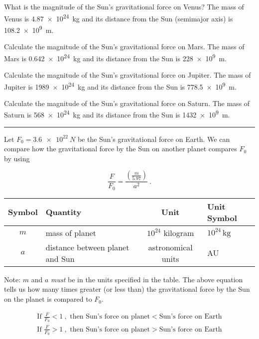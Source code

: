 \documentclass{article}
\begin{document}
\begin{problem}
What is the magnitude of the Sun's gravitational force on Venus? The mass of Venus is \SI{4.87e24}{kg} and its distance from the Sun (semimajor axis) is \SI{108.2e9}{m}. 
\end{problem}

\begin{problem}
    Calculate the magnitude of the Sun's gravitational force on Mars. The mass of Mars is \SI{0.642e24}{kg} and its distance from the Sun is \SI{228e9}{m}.
\end{problem}

\begin{problem}
    Calculate the magnitude of the Sun's gravitational force on Jupiter. The mass of Jupiter is \SI{1989e24}{kg} and its distance from the Sun is \SI{778.5e9}{m}.
\end{problem}

\begin{problem}
    Calculate the magnitude of the Sun's gravitational force on Saturn. The mass of Saturn is \SI{568e24}{kg} and its distance from the Sun is \SI{1432e9}{m}.
\end{problem}
\hrule

\clearpage
\begin{mdframed}[backgroundcolor=black!10]
Let $F_0 = \SI{3.6e22}{N}$ be the Sun's gravitational force on Earth. We can compare how the gravitational force by the Sun on another planet compares $F_0$ by using

\begin{equation*}
    \frac{F}{F_0} = \frac{\left(\frac{m}{5.97}\right)}{a^2}\ .
\end{equation*}

\begin{center}
    \begin{tabular}{cl|cl}
    \hline
    \textbf{Symbol} & \textbf{Quantity} & \textbf{Unit} & \textbf{Unit Symbol}  \\
    \hline\hline
    \rule{0pt}{2.5ex}
        $m$ & mass of planet & $10^{24}$ kilogram & $10^{24}\,\text{kg}$\\
        $a$ & distance between planet and Sun & astronomical units & AU\\
    \hline
    \end{tabular}
\end{center}

Note: $m$ and $a$ \textit{must} be in the units specified in the table. The above equation tells us how many times greater (or less than) the gravitational force by the Sun on the planet is compared to $F_0$. 
\vspace{-1em}

\begin{align*}
    \text{If } \frac{F}{F_0} < 1\ , \text{ then Sun's force on planet} < \text{Sun's force on Earth}\\[1ex]
    \text{If } \frac{F}{F_0} > 1\ , \text{ then Sun's force on planet} > \text{Sun's force on Earth} 
\end{align*}
\end{mdframed}
\end{document}
